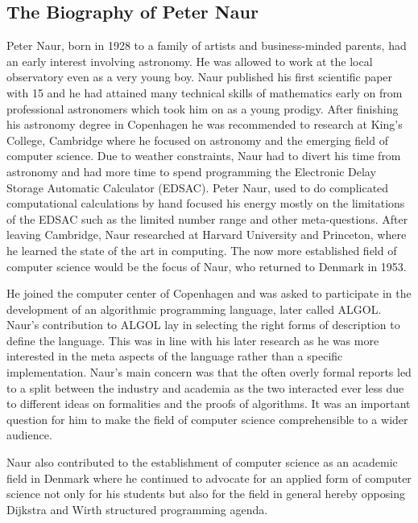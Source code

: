 \documentclass{article}
\begin{document}
\subsection{The Biography of Peter Naur}
Peter Naur, born in 1928 to a family of artists and business-minded parents, had an early interest involving astronomy. He was allowed to work at the local observatory even as a very young boy. Naur published his first scientific paper with 15 and he had attained many technical skills of mathematics early on from professional astronomers which took him on as a young prodigy. After finishing his astronomy degree in Copenhagen he was recommended to research at King's College, Cambridge where he focused on astronomy and the emerging field of computer science. Due to weather constraints, Naur had to divert his time from astronomy and had more time to spend programming the Electronic Delay Storage Automatic Calculator (EDSAC). Peter Naur, used to do complicated computational calculations by hand focused his energy mostly on the limitations of the EDSAC such as the limited number range and other meta-questions. After leaving Cambridge, Naur researched at Harvard University and Princeton, where he learned the state of the art in computing. The now more established field of computer science would be the focus of Naur, who returned to Denmark in 1953.

He joined the computer center of Copenhagen and was asked to participate in the development of an algorithmic programming language, later called ALGOL. Naur's contribution to ALGOL lay in selecting the right forms of description to define the language. This was in line with his later research as he was more interested in the meta aspects of the language rather than a specific implementation. Naur's main concern was that the often overly formal reports led to a split between the industry and academia as the two interacted ever less due to different ideas on formalities and the proofs of algorithms. It was an important question for him to make the field of computer science comprehensible to a wider audience.

Naur also contributed to the establishment of computer science as an academic field in Denmark where he continued to advocate for an applied form of computer science not only for his students but also for the field in general hereby opposing Dijkstra and Wirth structured programming agenda.
\end{document}
